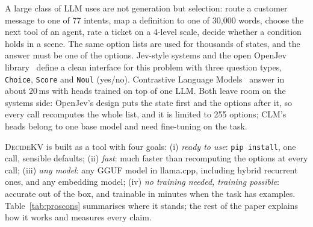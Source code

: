 \documentclass[11pt]{article}
\newcommand{\dkv}{\textsc{DecideKV}}
\newcommand{\ms}{\,ms}
\begin{document}
A large class of LLM uses are not generation but selection: route a customer message to one of 77 intents, map a
definition to one of 30{,}000 words, choose the next tool of an agent, rate a ticket on a 4-level scale, decide
whether a condition holds in a scene. The same option lists are used for thousands of states, and the answer must be
one of the options. Jev-style systems and the open OpenJev library~\citep{openjev} define a clean interface for this
problem with three question types, \texttt{Choice}, \texttt{Score} and \texttt{Noul} (yes/no). Contrastive Language
Models~\citep{clm} answer in about 20\ms{} with heads trained on top of one LLM. Both leave room on the systems side:
OpenJev's design puts the state first and the options after it, so every call recomputes the whole list, and it is
limited to 255 options; CLM's heads belong to one base model and need fine-tuning on the task.

\dkv{} is built as a tool with four goals: (i) \emph{ready to use}: \texttt{pip install}, one call, sensible
defaults; (ii) \emph{fast}: much faster than recomputing the options at every call; (iii) \emph{any model}: any GGUF
model in llama.cpp, including hybrid recurrent ones, and any embedding model; (iv) \emph{no training needed, training
possible}: accurate out of the box, and trainable in minutes when the task has examples. Table~\ref{tab:proscons}
summarises where it stands; the rest of the paper explains how it works and measures every claim.
\end{document}
